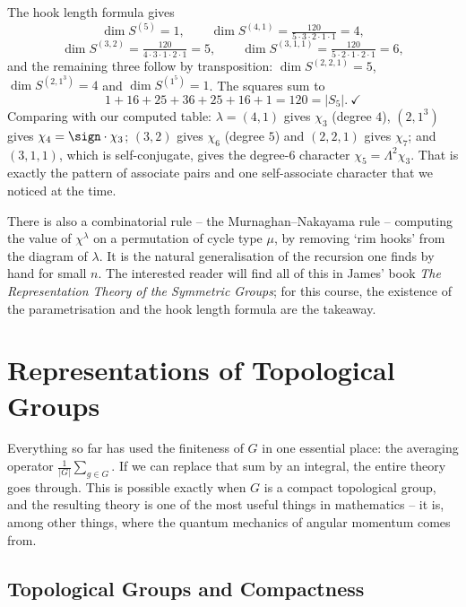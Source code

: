 \begin{example}
	The hook length formula gives
	$$\dim S^{(5)} = 1,\qquad \dim S^{(4,1)} = \tfrac{120}{5\cdot3\cdot2\cdot1\cdot1} = 4,$$
	$$\dim S^{(3,2)} = \tfrac{120}{4\cdot3\cdot1\cdot2\cdot1} = 5,\qquad \dim S^{(3,1,1)} = \tfrac{120}{5\cdot2\cdot1\cdot2\cdot1} = 6,$$
	and the remaining three follow by transposition: $\dim S^{(2,2,1)} = 5$, $\dim S^{(2,1^3)} = 4$ and $\dim S^{(1^5)} = 1$. The squares sum to
	$$1 + 16+25+36+25+16+1 = 120 = |S_5|.\ \checkmark$$
	Comparing with our computed table: $\lambda = (4,1)$ gives $\chi_3$ (degree $4$), $(2,1^3)$ gives $\chi_4 = \sign\cdot\chi_3$; $(3,2)$ gives $\chi_6$ (degree $5$) and $(2,2,1)$ gives $\chi_7$; and $(3,1,1)$, which is self-conjugate, gives the degree-$6$ character $\chi_5 = \Lambda^2\chi_3$. That is exactly the pattern of associate pairs and one self-associate character that we noticed at the time.
\end{example}

\begin{remark}
	There is also a combinatorial rule -- the Murnaghan--Nakayama rule -- computing the value of $\chi^\lambda$ on a permutation of cycle type $\mu$, by removing `rim hooks' from the diagram of $\lambda$. It is the natural generalisation of the recursion one finds by hand for small $n$. The interested reader will find all of this in James' book \emph{The Representation Theory of the Symmetric Groups}; for this course, the existence of the parametrisation and the hook length formula are the takeaway.
\end{remark}

\section{Representations of Topological Groups}

Everything so far has used the finiteness of $G$ in one essential place: the averaging operator $\frac1{|G|}\sum_{g\in G}$. If we can replace that sum by an integral, the entire theory goes through. This is possible exactly when $G$ is a compact topological group, and the resulting theory is one of the most useful things in mathematics -- it is, among other things, where the quantum mechanics of angular momentum comes from.

\subsection{Topological Groups and Compactness}

